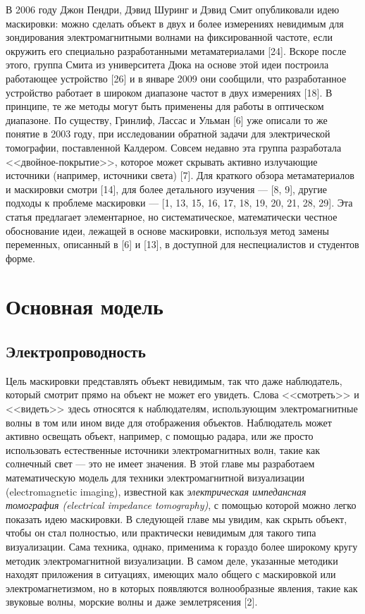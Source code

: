 \documentclass[a4paper, 12pt]{article}
\begin{document}
В 2006 году Джон Пендри, Дэвид Шуринг и Дэвид Смит опубликовали идею маскировки: можно сделать объект в двух и более измерениях невидимым для зондирования электромагнитными волнами на фиксированной частоте, если окружить его специально разработанными метаматериалами [24]. Вскоре после этого, группа Смита из университета Дюка на основе этой идеи построила работающее устройство [26] и в январе 2009 они сообщили, что разработанное устройство работает в широком диапазоне частот в двух измерениях [18]. В принципе, те же методы могут быть применены для работы в оптическом диапазоне. По существу, Гринлиф, Лассас и Ульман [6] уже описали то же понятие в 2003 году, при исследовании обратной задачи для электрической томографии, поставленной Калдером. Совсем недавно эта группа разработала <<двойное-покрытие>>, которое может скрывать активно излучающие источники (например, источники света) [7]. Для краткого обзора метаматериалов и маскировки смотри [14], для более детального изучения --- [8, 9], другие подходы к проблеме маскировки --- [1, 13, 15, 16, 17, 18, 19, 20, 21, 28, 29]. Эта статья предлагает элементарное, но систематическое, математически честное обоснование идеи, лежащей в основе маскировки, используя метод замены переменных, описанный в [6] и [13], в доступной для неспециалистов и студентов форме.

\section{Основная модель}
\subsection{Электропроводность}
Цель маскировки представлять объект невидимым, так что даже наблюдатель, который смотрит прямо на объект не может его увидеть. Слова <<смотреть>> и <<видеть>> здесь относятся к наблюдателям, использующим электромагнитные волны в том или ином виде для отображения объектов. Наблюдатель может активно освещать объект, например, с помощью радара, или же просто использовать естественные источники электромагнитных волн, такие как солнечный свет --- это не имеет значения. В этой главе мы разработаем математическую модель для техники электромагнитной визуализации (electromagnetic imaging), известной как \textit{электрическая импедансная томография (electrical impedance tomography)}, с помощью которой можно легко показать идею маскировки. В следующей главе мы увидим, как скрыть объект, чтобы он стал полностью, или практически невидимым для такого типа визуализации. Сама техника, однако, применима к гораздо более широкому кругу методик электромагнитной визуализации. В самом деле, указанные методики находят приложения в ситуациях, имеющих мало общего с маскировкой или электромагнетизмом, но в которых появляются волнообразные явления, такие как звуковые волны, морские волны и даже землетрясения [2].
\end{document}
